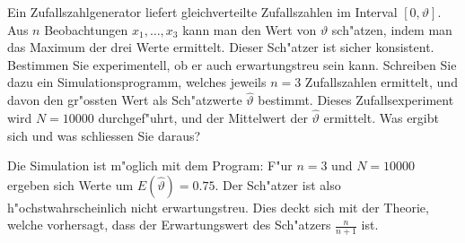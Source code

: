 Ein Zufallszahlgenerator liefert gleichverteilte Zufallszahlen im
Interval $[0,\vartheta]$. Aus $n$ Beobachtungen $x_1,\dots,x_3$ kann
man den Wert von $\vartheta$ sch"atzen, indem man das Maximum der
drei Werte ermittelt. Dieser Sch"atzer ist sicher konsistent.
Bestimmen Sie experimentell, ob er auch erwartungstreu sein kann.
Schreiben Sie dazu ein Simulationsprogramm, welches jeweils $n=3$
Zufallszahlen ermittelt, und davon den gr"ossten Wert als
Sch"atzwerte $\hat\vartheta$ bestimmt.
Dieses Zufallsexperiment wird $N=10000$ durchgef"uhrt, und der Mittelwert
der $\hat\vartheta$ ermittelt. Was ergibt sich und was schliessen Sie
daraus?

\begin{loesung}
Die Simulation ist m"oglich mit dem Program:
{\small
{}
}
F"ur $n=3$ und $N=10000$ ergeben sich Werte  um $E(\hat\vartheta)=0.75$.
Der Sch"atzer ist also h"ochstwahrscheinlich nicht erwartungstreu.
Dies deckt sich mit der Theorie, welche vorhersagt, dass der Erwartungswert
des Sch"atzers $\frac{n}{n+1}$ ist.
\end{loesung}

